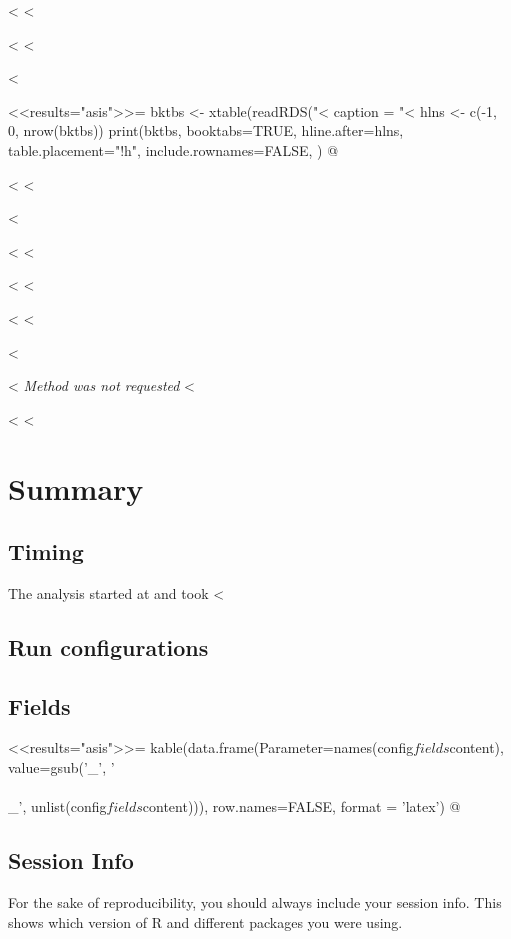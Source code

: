 \documentclass[a4,oneside,garamond,11.5pt]{scrartcl}
\begin{document}
{{{{{{<%
<%


<%
<%

<%

<<results="asis">>=
bktbs <- xtable(readRDS("<%
caption = "<%
hlns <- c(-1, 0, nrow(bktbs))
print(bktbs, booktabs=TRUE, hline.after=hlns, table.placement="!h", include.rownames=FALSE, 
)
@
\FloatBarrier

<%
<%

<%


<%
<%

<%
<%

<%
<%

<%

<%
\textit{Method was not requested}
<%


<%
<%


\section{Summary}
\subsection{Timing}
The analysis started at and took <%

\subsection{Run configurations}


\subsection{Fields}

<<results="asis">>=
kable(data.frame(Parameter=names(config$fields$content), value=gsub('_', '\\\\_', unlist(config$fields$content))), row.names=FALSE, format = 'latex')
@

\subsection{Session Info}
For the sake of reproducibility, you should always include your session info. This shows which version of R and different packages you were using. 

}}}}}}
\end{document}
